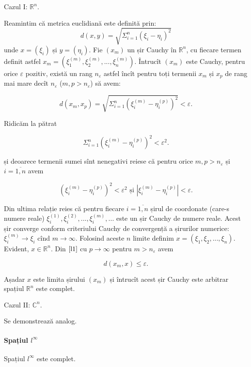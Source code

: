 \documentclass[a4paper,12pt]{article}
\theoremstyle{change}
\newenvironment{proof}{{\bf Demonstrație:} }{}
\begin{document}
\begin{proof}
Cazul I: $\mathbb{R}^n$.

Reamintim că metrica euclidiană este definită prin: 
\[
  d(x,y) = \sqrt{\Sigma_{i=1}^n (\xi_i - \eta_i)^2}
\]
unde $x=(\xi_i)$ și $y=(\eta_i)$. Fie $(x_m)$ un șir Cauchy în $\mathbb{R}^n$, cu fiecare termen definit astfel $x_m=(\xi_1^{(m)},\xi_2^{(m)},...,\xi_n^{(m)})$. Întrucît $(x_m)$ este Cauchy, pentru orice $\varepsilon$ pozitiv, există un rang $n_{\varepsilon}$ astfel încît pentru toți termenii $x_m$ și $x_p$ de rang mai mare decît $n_{\varepsilon}$ ($m,p>n_{\varepsilon}$) să avem:

\[
\label{l1}
d(x_m,x_p) = \sqrt{\Sigma_{i=1}^n (\xi_i^{(m)}-\eta_i^{(p)})^2} < \varepsilon.
\]

Ridicăm la pătrat

\[
\Sigma_{i=1}^n (\xi_i^{(m)}-\eta_i^{(p)})^2 < \varepsilon^2.
\]

și deoarece termenii sumei sînt nenegativi reiese că pentru orice $m,p>n_\varepsilon$ și $i=\overline{1,n}$ avem

\[
(\xi_i^{(m)}-\eta_i^{(p)})^2 < \varepsilon^2 \text{ și } |\xi_i^{(m)}-\eta_i^{(p)}| < \varepsilon.
\]

Din ultima relație reies că pentru fiecare $i=\overline{1,n}$ șirul de coordonate (care-s numere reale) $\xi_i^{(1)}, \xi_i^{(2)}, ..., \xi_i^{(m)}, ...$ este un șir Cauchy de numere reale. Acest șir converge conform criteriului Cauchy de convergență a șirurilor numerice: $\xi_i^{(m)}\to \xi_i$ cînd $m\to\infty$. Folosind aceste $n$ limite definim $x=(\xi_1,\xi_2,...,\xi_n)$. Evident, $x\in\mathbb{R}^n$. Din $\ref{l1}$ cu $p\to\infty$ pentru $m>n_\varepsilon$ avem

\[
d(x_m,x)\leq\varepsilon.
\]

Așadar $x$ este limita șirului $(x_m)$ și întrucît acest șir Cauchy este arbitrar spațiul $\mathbb{R}^n$ este complet.

Cazul II: $\mathbb{C}^n$.

Se demonstrează analog.

\end{proof}

\paragraph{Spațiul $l^\infty$} Spațiul $l^\infty$ este complet.
\end{document}
